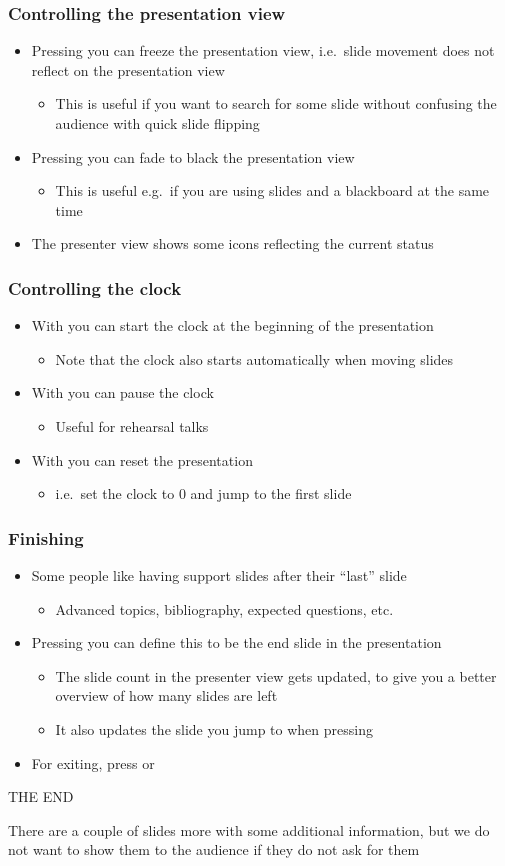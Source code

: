 \documentclass{beamer}
\newcommand{\singleitem}[1]{\begin{itemize}\item #1\end{itemize}}
\begin{document}
\begin{frame}
  \frametitle{Controlling the presentation view}
    \begin{itemize}
      \item Pressing  you can freeze the presentation view, i.e.\
        slide movement does not reflect on the presentation view
        \singleitem{This is useful if you want to search for some slide without
        confusing the audience with quick slide flipping}
      \item Pressing  you can fade to black the presentation view
        \singleitem{This is useful e.g.\ if you are using slides and a
        blackboard at the same time}
      \item The presenter view shows some icons reflecting the current status
    \end{itemize}
\end{frame}

\begin{frame}
  \frametitle{Controlling the clock}
  \begin{itemize}
    \item With  you can start the clock at the beginning of the
      presentation
      \singleitem{Note that the clock also starts automatically when moving slides}
    \item With \keystroke{P} you can pause the clock
      \singleitem{Useful for rehearsal talks}
    \item With  you can reset the presentation
      \singleitem{i.e.\ set the clock to 0 and jump to the first slide}
  \end{itemize}
\end{frame}

\begin{frame}
  \frametitle{Finishing}
  \begin{itemize}
    \item Some people like having support slides after their ``last'' slide
      \singleitem{Advanced topics, bibliography, expected questions, etc.}
    \item Pressing \keystroke{E} you can define this to be the end slide in the
      presentation
      \singleitem{The slide count in the presenter view gets updated, to give you
      a better overview of how many slides are left}
      \singleitem{It also updates the slide you jump to when pressing \End}
    \item For exiting, press \keystroke{Q} or \Esc
  \end{itemize}
  \vfill
  \begin{center}
    THE END
  \end{center}
  \vfill
  {\footnotesize There are a couple of slides more with some additional information,
  but we do not want to show them to the audience if they do not ask for them}
\end{frame}
\end{document}
